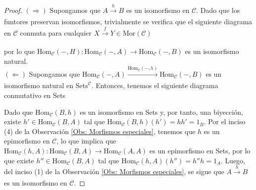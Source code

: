 \documentclass[tesis]{subfiles}
\begin{document}
\begin{proof}\leavevmode

    $(\Rightarrow)$ Supongamos que $A\xrightarrow[]{h}B$ es un isomorfismo en $\mathscr{C}$. Dado que los funtores preservan isomorfismos, trivialmente se verifica que el siguiente diagrama en $\mathscr{C}$ conmuta para cualquier $X\xrightarrow[]{f}Y\in\text{Mor}(\mathscr{C})$
    \begin{center}
    \end{center}
    por lo que $\text{Hom}_\mathscr{C}(-,H):\text{Hom}_\mathscr{C}(-,A)\to \text{Hom}_\mathscr{C}(-,B)$ es un isomorfismo natural. \\

    $(\Leftarrow)$ Supongamos que $\text{Hom}_\mathscr{C}(-,A)\xrightarrow[]{\text{Hom}_\mathscr{C}(-,h)}\text{Hom}_\mathscr{C}(-,B)$ es un isomorfismo natural en $\text{Sets}^\mathscr{C}$. Entonces, tenemos el siguiente diagrama conmutativo en Sets
    \begin{center}
    \end{center}
    Dado que $\text{Hom}_\mathscr{C}(B,h)$ es un isomorfismo en Sets y, por tanto, una biyección, existe $h'\in\text{Hom}_\mathscr{C}(B,A)$ tal que $\text{Hom}_\mathscr{C}(B,h)(h') = hh' = 1_B$. Por el inciso (4) de la Observación \ref{Obs: Morfismos especiales}, tenemos que $h$ es un epimorfismo en $\mathscr{C}$, lo que implica que $\text{Hom}_\mathscr{C}(h,A):\text{Hom}_\mathscr{C}(B,A)\to \text{Hom}_\mathscr{C}(A,A)$ es un epimorfismo en Sets, por lo que existe $h''\in\text{Hom}_\mathscr{C}(B,A)$ tal que $\text{Hom}_\mathscr{C}(h,A)(h'') = h''h=1_A$. Luego, del inciso (1) de la Observación \ref{Obs: Morfismos especiales}, se sigue que $A\xrightarrow[]{h}B$ es un isomorfismo en $\mathscr{C}$.
\end{proof}
\end{document}
